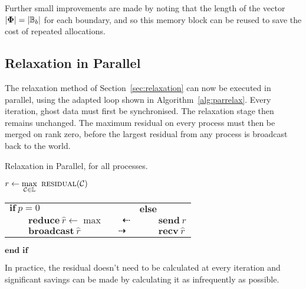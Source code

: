 \documentclass[twoside]{IIBproject}
\newcommand{\vect} [1] {\bm{#1}}
\newcommand{\dra}{\dashrightarrow}
\newcommand{\dla}{\dashleftarrow}
\numberwithin{figure}{section}
\begin{document}
        Further small improvements are made by noting that the length of the vector $\abs{\vect{\Phi}} = \abs{\mathbb{B}_b}$ for each boundary, and so this memory block can be reused to save the cost of repeated allocations.



    \subsection{Relaxation in Parallel} %
        \label{sec:parrelax}

        The relaxation method of Section~\ref{sec:relaxation} can now be executed in parallel, using the adapted loop shown in Algorithm~\ref{alg:parrelax}. Every iteration, ghost data must first be synchronised. The relaxation stage then remains unchanged. The maximum residual on every process must then be merged on rank zero, before the largest residual from any process is broadcast back to the world.

        \begin{algorithm}[!htbp]
            \caption{Relaxation in Parallel, for all processes.}
            \label{alg:parrelax}

            \begin{algorithmic}
                \Repeat
                    \State {}
                        \State {}
                    \EndFor
                    \State $r \gets \max\limits_{\mathcal{C}\in\mathbb{L}}\ \textproc{residual}(\mathcal{C})$
                    \Statex
                    \State \begin{tabularx}{0.8\textwidth}{XX}
                        $\textbf{if}\ p=0$ & $\textbf{else}$ \\
                        $\qquad\textbf{reduce}\ \hat r \gets \max\qquad\dla$ & $\qquad\textbf{send}\ r$ \\
                        $\qquad\textbf{broadcast}\ \hat r\qquad\qquad\dra$ & $\qquad\textbf{recv}\ \hat r$
                    \end{tabularx}
                    \State $\textbf{end if}$
                \Statex
            \end{algorithmic}
        \end{algorithm}

        In practice, the residual doesn't need to be calculated at every iteration and significant savings can be made by calculating it as infrequently as possible. 
\end{document}
